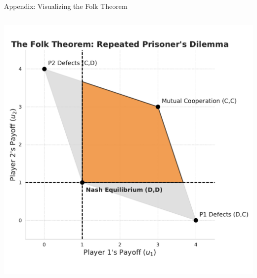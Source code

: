 \documentclass[10pt, aspectratio=169]{beamer}
\begin{document}
\begin{frame}{Appendix: Visualizing the Folk Theorem}\label{app:ft}
    \begin{columns}[T]
    \begin{column}{0.55\textwidth}
        \centering
        \includegraphics[width=\textwidth]{latex/slides_pricing_collusion/imgs/ft_plot.pdf}
    \end{column}
    

\end{columns}
\end{frame}
\end{document}
